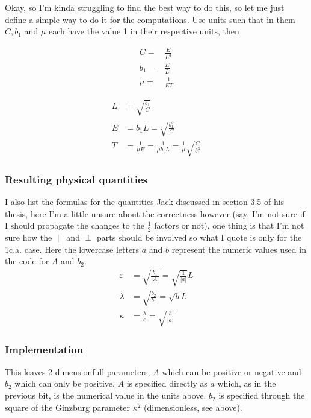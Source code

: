 \documentclass[11pt]{article}
\begin{document}
Okay, so I'm kinda struggling to find the best way to do this, so let me just define a simple way to do it for the computations.
Use units such that in them $C, b_1$ and $\mu$ each have the value 1 in their respective units, then
\par\noindent\begin{minipage}{.5\linewidth}
\begin{align}
    C =& \frac{E}{L^3} \nonumber \\
    b_1 =& \frac{E}{L} \\
    \mu =& \frac{1}{E T} \nonumber
\end{align}
\end{minipage}
\noindent\begin{minipage}{.5\linewidth}
\begin{align}
     L &= \sqrt{\frac{b_1}{C}} \nonumber \\
     E &= b_1 L = \sqrt{\frac{b_1^3}{C}} \\
     T &= \frac{1}{\mu E} = \frac{1}{\mu b_1 L} = \frac{1}{\mu} \sqrt{\frac{C}{b_1^3}} \nonumber
\end{align}
\end{minipage}

\subsubsection*{Resulting physical quantities}
I also list the formulas for the quantities Jack discussed in section 3.5 of his thesis, here I'm a little unsure about the correctness however (say, I'm not sure if I should propagate the changes to the $\frac{1}{2}$ factors or not), one thing is that I'm not sure how the $\parallel$ and $\perp$ parts should be involved so what I quote is only for the 1c.a. case.
Here the lowercase letters $a$ and $b$ represent the numeric values used in the code for $A$ and $b_2$.
\begin{align}
    \varepsilon &= \sqrt{\frac{b_1}{|A|}} = \sqrt{\frac{1}{|a|}} L \\
    \lambda &= \sqrt{\frac{b_2}{b_1}} = \sqrt{b} L \\
    \kappa &= \frac{\lambda}{\varepsilon} = \sqrt{\frac{b}{|a|}}
\end{align}

\subsubsection*{Implementation}
This leaves 2 dimensionfull parameters, $A$ which can be positive or negative and $b_2$ which can only be positive.
$A$ is specified directly as $a$ which, as in the previous bit, is the numerical value in the units above.
$b_2$ is specified through the square of the Ginzburg parameter $\kappa^2$ (dimensionless, see above).
\end{document}
